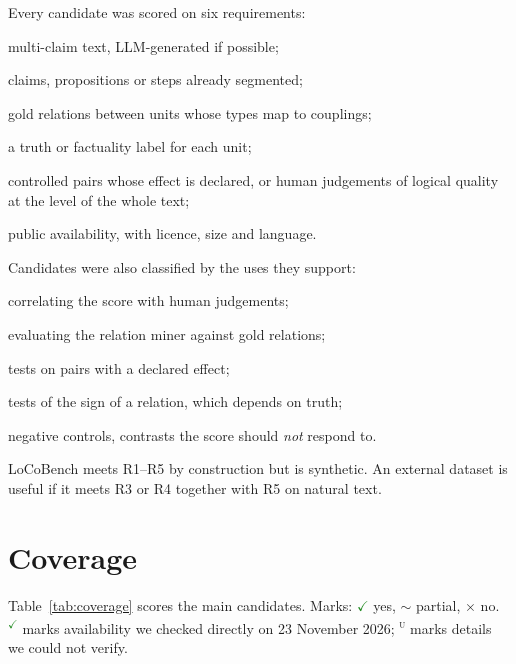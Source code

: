 \documentclass[10pt]{article}
\newcommand{\Y}{\textcolor{ForestGreen}{\ensuremath{\checkmark}}}
\newcommand{\Pa}{\textcolor{Dandelion!85!black}{\ensuremath{\sim}}}
\newcommand{\N}{\textcolor{BrickRed}{\ensuremath{\times}}}
\newcommand{\ok}{\textsuperscript{\textcolor{ForestGreen}{\ensuremath{\checkmark}}}}
\newcommand{\unv}{\textsuperscript{\textsc{u}}}
\begin{document}
Every candidate was scored on six requirements:
\begin{description}[font=\normalfont\bfseries,leftmargin=2.2em,style=sameline]
\item[R1] multi-claim text, LLM-generated if possible;
\item[R2] claims, propositions or steps already segmented;
\item[R3] gold relations between units whose types map to couplings;
\item[R4] a truth or factuality label for each unit;
\item[R5] controlled pairs whose effect is declared, or human judgements of logical quality at the
  level of the whole text;
\item[R6] public availability, with licence, size and language.
\end{description}
Candidates were also classified by the uses they support:
\begin{description}[font=\normalfont\bfseries,leftmargin=2.2em,style=sameline]
\item[U1] correlating the score with human judgements;
\item[U2] evaluating the relation miner against gold relations;
\item[U3] tests on pairs with a declared effect;
\item[U4] tests of the sign of a relation, which depends on truth;
\item[NC] negative controls, contrasts the score should \emph{not} respond to.
\end{description}
LoCoBench meets R1--R5 by construction but is synthetic. An external dataset is useful if it meets
R3 or R4 together with R5 on natural text.

\section{Coverage}

Table~\ref{tab:coverage} scores the main candidates. Marks: \Y{} yes, \Pa{} partial, \N{} no.
\ok{} marks availability we checked directly on 23 November 2026; \unv{} marks details we could not
verify.
\end{document}
